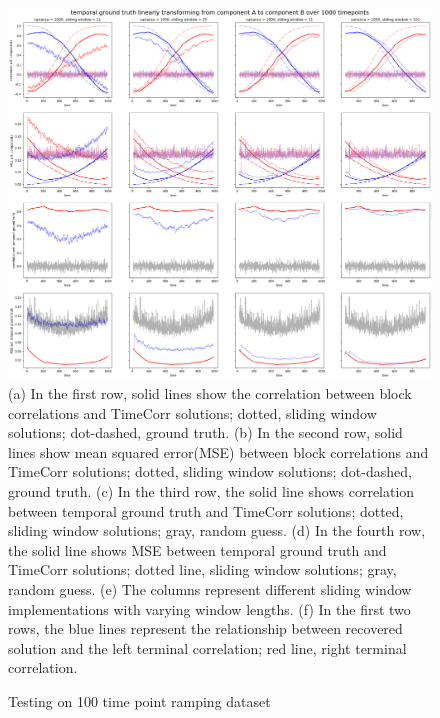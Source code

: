 \documentclass[11pt]{article}
\begin{document}
\begin{figure}[!htb]
\caption{Testing on 100 time point ramping dataset}
\includegraphics[width=1\textwidth]{../figures/SyntheticTesting/ramp1000t4slide.png}
\label{fig:ramp1000t4slide}
(a) In the first row, solid lines show the correlation between block correlations and TimeCorr solutions; dotted, sliding window solutions; dot-dashed, ground truth. (b) In the second row, solid lines show mean squared error(MSE) between block correlations and TimeCorr solutions; dotted, sliding window solutions; dot-dashed, ground truth. (c) In the third row, the solid line shows correlation between temporal ground truth and TimeCorr solutions; dotted, sliding window solutions; gray, random guess. (d) In the fourth row, the solid line shows MSE between temporal ground truth and TimeCorr solutions; dotted line, sliding window solutions; gray, random guess. (e) The columns represent different sliding window implementations with varying window lengths. (f) In the first two rows, the blue lines represent the relationship between recovered solution and the left terminal correlation; red line, right terminal correlation.
\end{figure}
\end{document}
